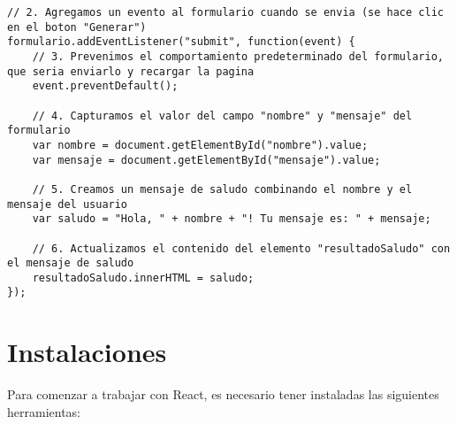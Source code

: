 \documentclass[executivepaper]{article}
\begin{document}
\begin{enumerate}
\begin{lstlisting}
// 2. Agregamos un evento al formulario cuando se envia (se hace clic en el boton "Generar")
formulario.addEventListener("submit", function(event) {
    // 3. Prevenimos el comportamiento predeterminado del formulario, que seria enviarlo y recargar la pagina
    event.preventDefault();

    // 4. Capturamos el valor del campo "nombre" y "mensaje" del formulario
    var nombre = document.getElementById("nombre").value;
    var mensaje = document.getElementById("mensaje").value;

    // 5. Creamos un mensaje de saludo combinando el nombre y el mensaje del usuario
    var saludo = "Hola, " + nombre + "! Tu mensaje es: " + mensaje;

    // 6. Actualizamos el contenido del elemento "resultadoSaludo" con el mensaje de saludo
    resultadoSaludo.innerHTML = saludo;
});
\end{lstlisting}
\end{enumerate}

\newpage
\section{Instalaciones}

Para comenzar a trabajar con React, es necesario tener instaladas las siguientes herramientas:
\end{document}
